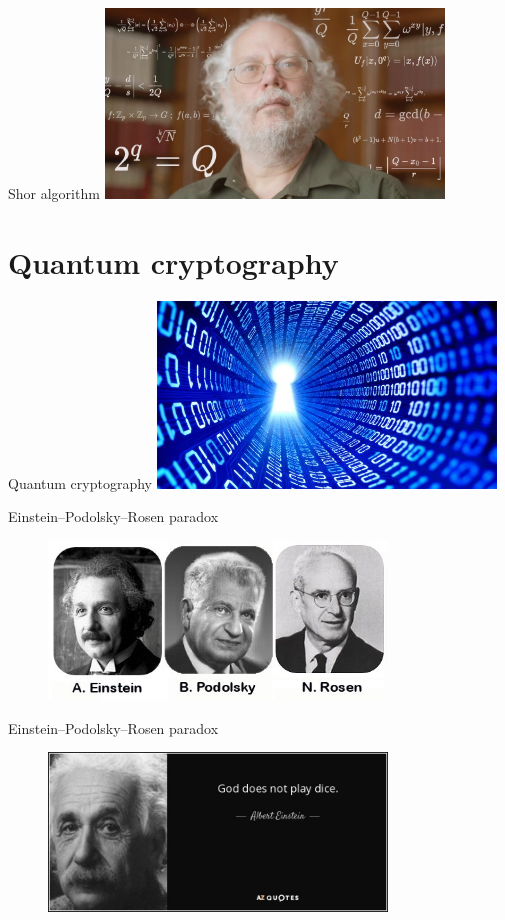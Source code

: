 \documentclass[10pt,pdf,hyperref={unicode}]{beamer}
\begin{document}
\begin{frame}{Shor algorithm}
  \includegraphics[width=90mm,scale=0.5]{shor.jpg}
\end{frame}


\section{Quantum cryptography}

\begin{frame}{Quantum cryptography}
  \includegraphics[width=90mm,scale=0.5]{quantum.jpg}
\end{frame}

\begin{frame}{Einstein–Podolsky–Rosen paradox}
 \begin{figure} 
   \includegraphics[width=90mm,scale=0.5]{epr.jpg}
  \end{figure}
\end{frame}

\begin{frame}{Einstein–Podolsky–Rosen paradox}
 \begin{figure} 
   \includegraphics[width=90mm,scale=0.5]{goddice.jpg}
  \end{figure}
\end{frame}
\end{document}
